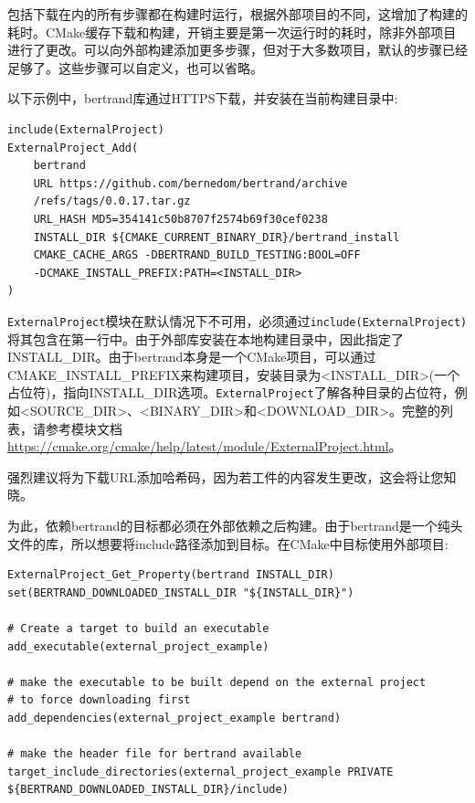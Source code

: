 包括下载在内的所有步骤都在构建时运行，根据外部项目的不同，这增加了构建的耗时。CMake缓存下载和构建，开销主要是第一次运行时的耗时，除非外部项目进行了更改。可以向外部构建添加更多步骤，但对于大多数项目，默认的步骤已经足够了。这些步骤可以自定义，也可以省略。

以下示例中，bertrand库通过HTTPS下载，并安装在当前构建目录中:

\begin{lstlisting}[style=styleCMake]
include(ExternalProject)
ExternalProject_Add(
	bertrand
	URL https://github.com/bernedom/bertrand/archive
	/refs/tags/0.0.17.tar.gz
	URL_HASH MD5=354141c50b8707f2574b69f30cef0238
	INSTALL_DIR ${CMAKE_CURRENT_BINARY_DIR}/bertrand_install
	CMAKE_CACHE_ARGS -DBERTRAND_BUILD_TESTING:BOOL=OFF
	-DCMAKE_INSTALL_PREFIX:PATH=<INSTALL_DIR>
)
\end{lstlisting} 

\texttt{ExternalProject}模块在默认情况下不可用，必须通过\texttt{include(ExternalProject)}将其包含在第一行中。由于外部库安装在本地构建目录中，因此指定了INSTALL\_DIR。由于bertrand本身是一个CMake项目，可以通过CMAKE\_INSTALL\_PREFIX来构建项目，安装目录为<INSTALL\_DIR>(一个占位符)，指向INSTALL\_DIR选项。\texttt{ExternalProject}了解各种目录的占位符，例如<SOURCE\_DIR>、<BINARY\_DIR>和<DOWNLOAD\_DIR>。完整的列表，请参考模块文档\url{https://cmake.org/cmake/help/latest/module/ExternalProject.html}。

\begin{tcolorbox}[colback=blue!5!white,colframe=blue!75!black,title=下载验证]
强烈建议将为下载URL添加哈希码，因为若工件的内容发生更改，这会将让您知晓。
\end{tcolorbox}

为此，依赖bertrand的目标都必须在外部依赖之后构建。由于bertrand是一个纯头文件的库，所以想要将include路径添加到目标。在CMake中目标使用外部项目:

\begin{lstlisting}[style=styleCMake]
ExternalProject_Get_Property(bertrand INSTALL_DIR)
set(BERTRAND_DOWNLOADED_INSTALL_DIR "${INSTALL_DIR}")

# Create a target to build an executable
add_executable(external_project_example)

# make the executable to be built depend on the external project
# to force downloading first
add_dependencies(external_project_example bertrand)

# make the header file for bertrand available
target_include_directories(external_project_example PRIVATE
${BERTRAND_DOWNLOADED_INSTALL_DIR}/include)
\end{lstlisting}

